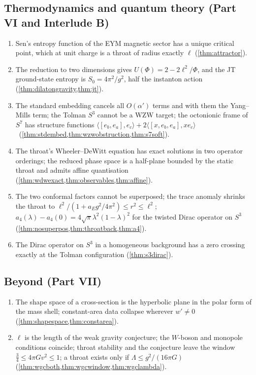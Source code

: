 \subsection*{Thermodynamics and quantum theory (Part VI and Interlude B)}
\begin{enumerate}[label=R\arabic*.,leftmargin=*,resume]
\item Sen's entropy function of the EYM magnetic sector has a unique critical point, which at unit charge is a throat of radius exactly $\ell$ (\cref{thm:attractor}).
\item The reduction to two dimensions gives $U(\Phi)=2-2\ell^2/\Phi$, and the JT ground-state entropy is $S_0=4\pi^2/g^2$, half the instanton action (\cref{thm:dilatongravity,thm:jt}).
\item The standard embedding cancels all $O(\alpha')$ terms and with them the Yang--Mills term; the Tolman $S^3$ cannot be a WZW target; the octonionic frame of $S^7$ has structure functions $\langle[e_b,e_a],e_c\rangle+2\langle[x,e_b,e_a],xe_c\rangle$ \txt\ (\cref{thm:stdembed,thm:wzwobstruction,thm:s7soft}).
\item The throat's Wheeler--DeWitt equation has exact solutions in two operator orderings; the reduced phase space is a half-plane bounded by the static throat and admits affine quantisation (\cref{thm:wdwexact,thm:observables,thm:affine}).
\item The two conformal factors cannot be superposed; the trace anomaly shrinks the throat to $\ell^2/(1+a_Eg^2/4\pi^2)\le r^2\le\ell^2$; $a_4(\lambda)-a_4(0)=4\sqrt\pi\lambda^2(1-\lambda)^2$ for the twisted Dirac operator on $S^3$ (\cref{thm:nosuperpos,thm:throatback,thm:a4}).
\item The Dirac operator on $S^3$ in a homogeneous background has a zero crossing exactly at the Tolman configuration (\cref{thm:s3dirac}).
\end{enumerate}

\subsection*{Beyond (Part VII)}
\begin{enumerate}[label=R\arabic*.,leftmargin=*,resume]
\item The shape space of a cross-section is the hyperbolic plane in the polar form of the mass shell; constant-area data collapse wherever $w'\ne0$ (\cref{thm:shapespace,thm:constarea}).
\item $\ell$ is the length of the weak gravity conjecture; the $W$-boson and monopole conditions coincide; throat stability and the conjecture leave the window $\frac34\le4\pi Gv^2\le1$; a throat exists only if $\Lambda\le g^2/(16\pi G)$ (\cref{thm:wgcboth,thm:wgcwindow,thm:wgclambda}).
\end{enumerate}

\tableofcontents
\mainmatter
